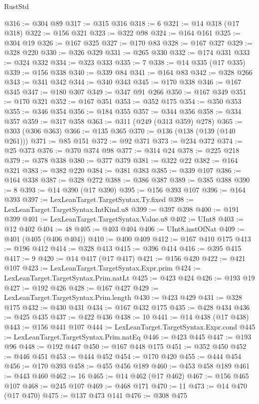 \begin{lexlean}{RustStd}
\begin{coremodule}
{\begin{coremodule}
{{{{{{{{{{{{{{{{{{{{{{{{{{{{{{{{{{@316 := @304 @89
@317 := @315 @316
@318 := 6
@321 := @14 @318 (@17 @318)
@322 := @156 @321
@323 := @322 @98
@324 := @164 @161
@325 := @304 @19
@326 := @167 @325
@327 := @170 @83
@328 := @167 @327
@329 := @328 @220
@330 := @326 @329
@331 := @265 @330
@332 := @174 @331
@333 := @324 @332
@334 := @323 @333
@335 := 7
@338 := @14 @335 (@17 @335)
@339 := @156 @338
@340 := @339 @84
@341 := @164 @83
@342 := @328 @266
@343 := @341 @342
@344 := @340 @343
@345 := @170 @338
@346 := @167 @345
@347 := @180 @307
@349 := @347 @91 @266
@350 := @167 @349
@351 := @170 @321
@352 := @167 @351
@353 := @352 @175
@354 := @350 @353
@355 := @346 @354
@356 := @184 @355
@357 := @344 @356
@358 := @334 @357
@359 := @317 @358
@363 := @311 (@249 (@313 @359) @278)
@365 := @303 (@306 @363)
@366 := @135 @365
@370 := @136 (@138 (@139 (@140 @261)))
@371 := @85 @151
@372 := @92 @371
@373 := @234 @372
@374 := @25 @373
@376 := @370 @374 @98
@377 := @314 @24
@378 := @225 @218
@379 := @378 @338
@380 := @377 @379
@381 := @322 @22
@382 := @164 @321
@383 := @382 @220
@384 := @381 @383
@385 := @339 @107
@386 := @164 @338
@387 := @328 @272
@388 := @386 @387
@389 := @385 @388
@390 := 8
@393 := @14 @390 (@17 @390)
@395 := @156 @393 @107
@396 := @164 @393
@397 := LexLeanTarget.TargetSyntax.Ty.fixed
@398 := LexLeanTarget.TargetSyntax.IntKind.u8
@399 := @397 @398
@400 := @191 @399
@401 := LexLeanTarget.TargetSyntax.Value.u8
@402 := UInt8
@403 := @12 @402
@404 := 48
@405 := @403 @404
@406 := UInt8.instOfNat
@409 := @401 (@405 (@406 @404))
@410 := @400 @409
@412 := @167 @410 @175
@413 := @196 @412
@414 := @328 @413
@415 := @396 @414
@416 := @395 @415
@417 := 9
@420 := @14 @417 (@17 @417)
@421 := @156 @420
@422 := @421 @107
@423 := LexLeanTarget.TargetSyntax.Expr.prim
@424 := LexLeanTarget.TargetSyntax.Prim.natLt
@425 := @423 @424
@426 := @193 @19
@427 := @192 @426
@428 := @167 @427
@429 := LexLeanTarget.TargetSyntax.Prim.length
@430 := @423 @429
@431 := @328 @175
@432 := @430 @431
@434 := @167 @432 @175
@435 := @428 @434
@436 := @425 @435
@437 := @422 @436
@438 := 10
@441 := @14 @438 (@17 @438)
@443 := @156 @441 @107
@444 := LexLeanTarget.TargetSyntax.Expr.cond
@445 := LexLeanTarget.TargetSyntax.Prim.natEq
@446 := @423 @445
@447 := @193 @96
@448 := @192 @447
@450 := @167 @448 @175
@451 := @352 @450
@452 := @446 @451
@453 := @444 @452
@454 := @170 @420
@455 := @444 @454
@456 := @170 @393
@458 := @455 @456 @189
@460 := @453 @458 @189
@461 := @443 @460
@462 := 16
@465 := @14 @462 (@17 @462)
@467 := @156 @465 @107
@468 := @245 @107
@469 := @468 @171
@470 := 11
@473 := @14 @470 (@17 @470)
@475 := @137 @473 @141
@476 := @308 @475
}}}}}}}}}}}}}}}}}}}}}}}}}}}}}}}}}}
\end{coremodule}}
\end{coremodule}
\end{lexlean}
